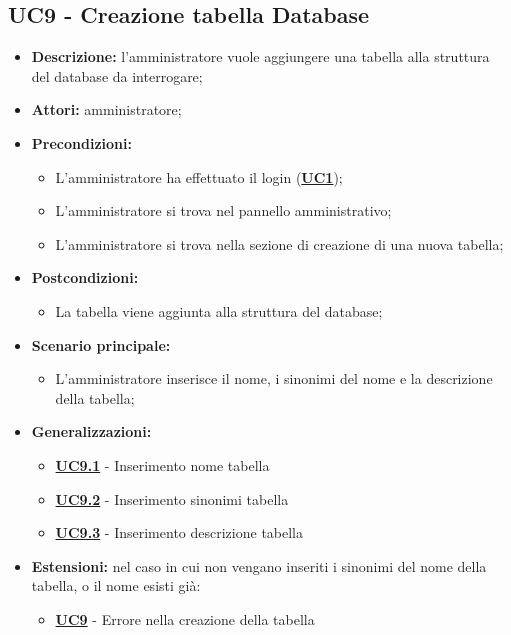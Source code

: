 \subsection{UC9 - Creazione tabella Database}
\label{sec:UC9}
\begin{itemize}
	\item \textbf{Descrizione:} l’amministratore vuole aggiungere una tabella alla struttura del database da interrogare;
	\item \textbf{Attori:} amministratore;
	\item \textbf{Precondizioni:} 
	\begin{itemize}
		\item L’amministratore ha effettuato il login (\hyperref[sec:UC1]{\textbf{UC1}});
		\item L’amministratore si trova nel pannello amministrativo;
		\item L’amministratore si trova nella sezione di creazione di una nuova tabella;
	\end{itemize}
	\item \textbf{Postcondizioni:} 
	\begin{itemize}
		\item La tabella viene aggiunta alla struttura del database;
	\end{itemize}
	\item \textbf{Scenario principale:} 
	\begin{itemize}
		\item L’amministratore inserisce il nome, i sinonimi del nome e la descrizione della tabella;
	\end{itemize}
	\item \textbf{Generalizzazioni:} 
	\begin{itemize}
		\item \hyperref[sec:UC9.1]{\textbf{UC9.1}} - Inserimento nome tabella
		\item \hyperref[sec:UC9.2]{\textbf{UC9.2}} - Inserimento sinonimi tabella
		\item \hyperref[sec:UC9.3]{\textbf{UC9.3}} - Inserimento descrizione tabella
	\end{itemize}
	\item \textbf{Estensioni:} nel caso in cui non vengano inseriti i sinonimi del nome della tabella, o il nome esisti già:
	\begin{itemize}
		\item \hyperref[sec:UC9]{\textbf{UC9}} - Errore nella creazione della tabella
	\end{itemize}
\end{itemize}


